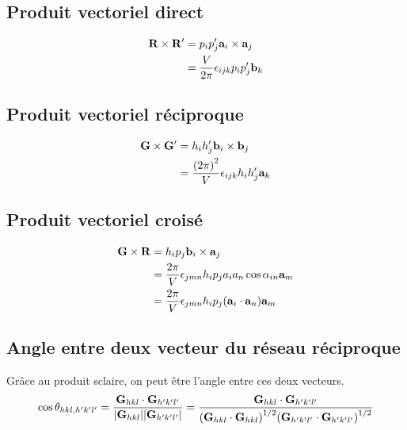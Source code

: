 \documentclass[11pt]{article}
\begin{document}
\subsection{Produit vectoriel direct}

\begin{align*}
	\vb{R} \times \vb{R}^\prime &= p_i p_j^\prime \vb{a}_i \times \vb{a}_j \\
	&= \frac{V}{2\pi} \epsilon_{ijk} p_i p_j^\prime \vb{b}_k
\end{align*}

\subsection{Produit vectoriel réciproque}
\begin{align*}
	\vb{G} \times \vb{G}^\prime &= h_i h_j^\prime \vb{b}_i \times \vb{b}_j \\
	&= \frac{\pqty{2\pi}^2}{V} \epsilon_{ijk}  h_i h_j^\prime  \vb{a}_k
\end{align*}

\subsection{Produit vectoriel croisé}
\begin{align*}
	\vb{G} \times \vb{R} &= h_i p_j \vb{b}_i \times \vb{a}_j \\
	&= \frac{2\pi}{V} \epsilon_{jmn} h_i p_j  a_ia_n\cos\alpha_{in}\vb{a}_m \\
	&= \frac{2\pi}{V} \epsilon_{jmn} h_i p_j  \pqty{\vb{a}_i \cdot \vb{a}_n}\vb{a}_m
\end{align*}


\subsection{Angle entre deux vecteur du réseau réciproque} %
\label{sub:angle_entre_deux_vecteur_du_réseau_réciproque}

Grâce au produit sclaire, on peut être l'angle entre ces deux vecteurs.
\begin{align*}
	\cos\theta_{hkl,h^\prime k^\prime l^\prime} = \frac{\vb{G}_{hkl} \cdot \vb{G}_{h^\prime k^\prime l^\prime}}{\abs{\vb{G}_{hkl}}  \abs{\vb{G}_{h^\prime k^\prime l^\prime}}} = \frac{\vb{G}_{hkl} \cdot \vb{G}_{h^\prime k^\prime l^\prime}}{\pqty{\vb{G}_{hkl} \cdot \vb{G}_{hkl}}^{1/2}\pqty{\vb{G}_{h^\prime k^\prime l^\prime} \cdot \vb{G}_{h^\prime k^\prime l^\prime}}^{1/2}} 
\end{align*}
\end{document}
